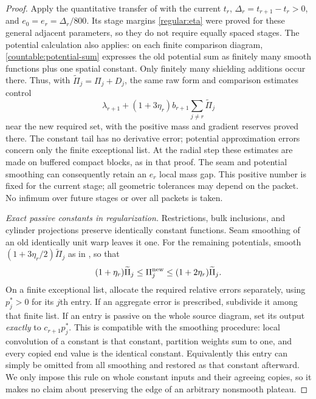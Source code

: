 \begin{proof}
Apply the quantitative transfer of  with the
current $t_r$, $\Delta_r=t_{r+1}-t_r>0$, and $e_0=e_r=\Delta_r/800$.
Its stage margins \eqref{regular:eta} were proved for these general
adjacent parameters, so they do not require equally spaced stages.
The potential calculation also applies: on each finite comparison
diagram, \eqref{countable:potential-sum} expresses the old potential
sum as finitely many smooth functions plus one spatial constant.
Only finitely many shielding additions occur there. Thus, with
$\widetilde\Pi_j=\Pi_j+D_j$, the same raw form and comparison estimates
control
\begin{equation}\label{countable:raw-target}
 \lambda_{r+1}+(1+3\eta_r)b_{r+1}
                         \sum_{j\ne r}\widetilde\Pi_j
\end{equation}
near the new required set, with the positive mass and gradient reserves
proved there. The constant tail has no derivative error; potential
approximation errors concern only the finite exceptional list. At the
radial step these estimates are made on buffered compact blocks, as
in that proof.
The seam and potential smoothing can consequently retain an $e_r$
local mass gap. This positive number is fixed for the current stage;
all geometric tolerances may depend on the packet. No infimum over
future stages or over all packets is taken.

\emph{Exact passive constants in regularization.}
Restrictions, bulk inclusions, and cylinder projections preserve
identically constant functions. Seam smoothing of an old identically
unit warp leaves it one. For the remaining potentials, smooth
$(1+3\eta_r/2)\widetilde\Pi_j$ as in
, so that
\begin{equation}\label{countable:smooth-potentials}
 (1+\eta_r)\widetilde\Pi_j\le\Pi_j^{\rm new}
                     \le(1+2\eta_r)\widetilde\Pi_j.
\end{equation}
On a finite exceptional list, allocate the required relative errors
separately, using $p_j^*>0$ for its $j$th entry. If an aggregate error
is prescribed, subdivide it among that finite list. If an entry is
passive on the whole source diagram, set its output \emph{exactly} to
$c_{r+1}p_j^*$. This is compatible with the smoothing procedure:
local convolution of a constant is that constant, partition weights
sum to one, and every copied end value is the identical constant.
Equivalently this entry can simply be omitted from all smoothing and
restored as that constant afterward. We only impose this rule on
whole constant inputs and their agreeing copies, so it makes no claim
about preserving the edge of an arbitrary nonsmooth plateau.


\end{proof}
